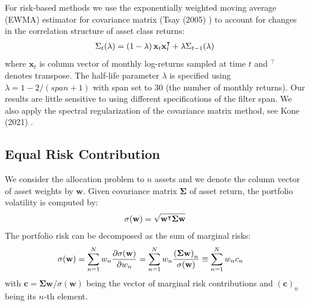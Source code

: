 \documentclass[pdftex,11pt,a4paper] {article}
\begin{document}
For risk-based methods we use the exponentially weighted moving average (EWMA) estimator for covariance matrix (Tsay (2005) \cite{Tsay2010}) to account for changes in the correlation structure of asset class returns:\vspace*{-0.5\baselineskip}
\begin{equation}\label{eq:cm1}
\begin{split}
 \Sigma_{t}(\lambda) = \left(1-\lambda\right)  \mathbf{x}_{t} \mathbf{x}^{\intercal}_{t}    + \lambda   \Sigma_{t-1}(\lambda)\vspace*{-0.5\baselineskip}
\end{split}
\end{equation}
where $\mathbf{x}_{t}$ is column vector of monthly log-returns sampled at time $t$ and $^{\intercal}$ denotes transpose. The half-life parameter $\lambda$ is specified using $\lambda=1-2/(span+1)$ with span set to $30$ (the number of monthly returns). Our results are little sensitive to using different specifications of the filter span. We also apply the spectral regularization of the covariance matrix method, see Kone (2021) \cite{Kone2021}.



\subsection{Equal Risk Contribution}

We consider the allocation problem to $n$ assets and we denote the column vector of asset weights by $\mathbf{w}$. Given covariance matrix $\mathbf{\Sigma}$ of asset return, the portfolio volatility is computed by:\vspace*{-0.5\baselineskip}
\begin{equation}\label{eq:ew1}
\begin{split}
\sigma(\mathbf{w}) =  \sqrt{\mathbf{w}^{\intercal} \mathbf{\Sigma}\mathbf{w}}\vspace*{-1.0\baselineskip}
\end{split}
\end{equation}
The portfolio risk can be decomposed as the sum of marginal risks:\vspace*{-0.5\baselineskip}
\begin{equation}\label{eq:ew2}
\begin{split}
 \sigma(\mathbf{w}) & =  \sum^{N}_{n=1} w_{n} \frac{\partial \sigma(\mathbf{w})}{\partial w_{n}} = \sum^{N}_{n=1} w_{n} \frac{\left(\mathbf{\Sigma} \mathbf{w} \right)_{n} }{ \sigma(\mathbf{w}) }\equiv \sum^{N}_{n=1}  w_{n} c_{n}\vspace*{-1.0\baselineskip}
\end{split}
\end{equation}
with $\mathbf{c}=\mathbf{\Sigma} \mathbf{w} / \sigma(\mathbf{w})$ being the vector of marginal risk contributions and $(\mathbf{c})_{n}$ being its $n$-th element.
\end{document}

